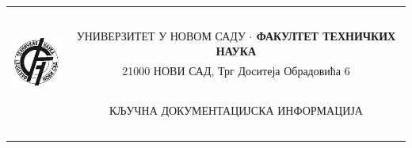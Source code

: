 \documentclass{article}
\begin{document}
\clearpage

\begin{center}
\begin{tabular}{|c|c|}
\hline
     & \ \\
    \multirow{3}{*}{{\includegraphics[width=0.75in]{Images/FTN.png}}}
    & 
    УНИВЕРЗИТЕТ У НОВОМ САДУ  \textbf{ {\large$\cdot$} ФАКУЛТЕТ ТЕХНИЧКИХ НАУКА} \\
     & 21000 НОВИ САД, Трг Доситеја Обрадовића 6 \\
     \cline{2-2} & \cellcolor{gray!25}\ \\
     & \cellcolor{gray!25}КЉУЧНА ДОКУМЕНТАЦИЈСКА ИНФОРМАЦИЈА \\
     & \cellcolor{gray!25}\ \\
    \hline
\end{tabular}
\end{center}
\end{document}
